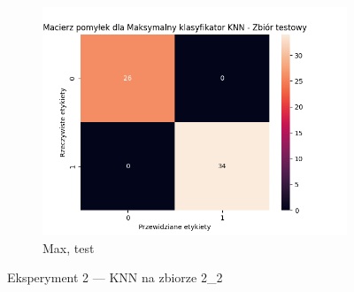 \documentclass[12pt]{article}
\newcommand*{\subfigwidth}{0.24\textwidth}
\begin{document}
\begin{figure}[H]
\begin{subfigure}[t]{\subfigwidth}
        \includegraphics[width=\linewidth]{img/exp_2/knn/2_2/max/test_matrix.png}
        \caption{Max, test}
    \end{subfigure} 
    
    \caption{Eksperyment 2 --- KNN na zbiorze 2\_2}
\end{figure}
\end{document}
